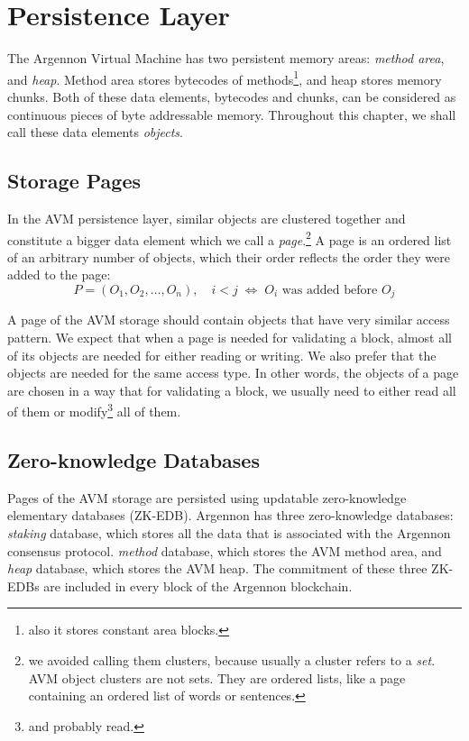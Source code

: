 

\section{Persistence Layer}\label{sec:persistence-layer}

The Argennon Virtual Machine has two persistent memory areas: \emph{method area}, and \emph{heap}. Method area stores
bytecodes of methods\footnote{also it stores constant area blocks.}, and heap stores memory chunks. Both of these
data elements, bytecodes and chunks, can be considered as continuous pieces of byte addressable memory. Throughout this
chapter, we shall call these data elements \emph{objects}.

\subsection{Storage Pages}\label{subsec:pages}

In the AVM persistence layer, similar objects are clustered together and constitute a bigger data element which we call
a \emph{page}.\footnote{we avoided calling them clusters, because usually a cluster refers to a \emph{set}. AVM object
clusters are not sets. They are ordered lists, like a page containing an ordered list of words or sentences.}
A page is an ordered list of an arbitrary number of objects, which their order reflects the order they were added to
the page:
\[
    P = (O_1,O_2,\dots,O_n),\quad i < j \; \Leftrightarrow \; \textrm{$O_i$ was added before $O_j$}
\]

A page of the AVM storage should contain objects that have very similar access pattern. We expect that when a page
is needed for validating a block, almost all of its objects are needed for either reading or writing. We also prefer
that the objects are needed for the same access type. In other words, the objects of a page are chosen in a way that
for validating a block, we usually need to either read all of them or modify\footnote{and probably read.} all of them.

\subsection{Zero-knowledge Databases}\label{subsec:zk-edb}

Pages of the AVM storage are persisted using updatable zero-knowledge elementary databases (ZK-EDB). Argennon
has three zero-knowledge databases: \emph{staking} database, which stores all the data that is associated with
the Argennon consensus protocol. \emph{method} database, which stores the AVM method area, and \emph{heap} database,
which stores the AVM heap. The commitment of these three ZK-EDBs are included in every block of the Argennon blockchain.

